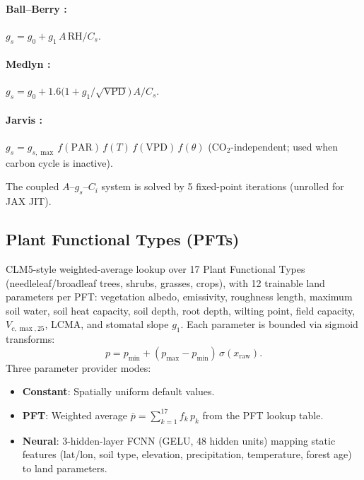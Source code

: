 \documentclass[11pt,a4paper]{article}
\begin{document}
\paragraph{Ball--Berry \citep{Ball1987}:}
$g_s = g_0 + g_1\,A\,\mathrm{RH}/C_s.$

\paragraph{Medlyn \citep{Medlyn2011}:}
$g_s = g_0 + 1.6\bigl(1+g_1/\!\sqrt{\mathrm{VPD}}\bigr)\,A/C_s.$

\paragraph{Jarvis \citep{Jarvis1976}:}
$g_s = g_{s,\max}\,f(\mathrm{PAR})\,f(T)\,f(\mathrm{VPD})\,f(\theta)$ \quad (CO$_2$-independent; used when carbon cycle is inactive).

The coupled $A$--$g_s$--$C_i$ system is solved by 5 fixed-point iterations (unrolled for JAX JIT).

\subsection{Plant Functional Types (PFTs)}

CLM5-style weighted-average lookup over 17 Plant Functional Types (needleleaf/broadleaf trees, shrubs, grasses, crops), with 12 trainable land parameters per PFT: vegetation albedo, emissivity, roughness length, maximum soil water, soil heat capacity, soil depth, root depth, wilting point, field capacity, $V_{c,\max,25}$, LCMA, and stomatal slope $g_1$.  Each parameter is bounded via sigmoid transforms:
\begin{equation}
  p = p_{\min} + (p_{\max}-p_{\min})\,\sigma(x_{\mathrm{raw}}).
\end{equation}
Three parameter provider modes:
\begin{itemize}[nosep]
  \item \textbf{Constant}: Spatially uniform default values.
  \item \textbf{PFT}: Weighted average $\bar p=\sum_{k=1}^{17}f_k\,p_k$ from the PFT lookup table.
  \item \textbf{Neural}: 3-hidden-layer FCNN (GELU, 48 hidden units) mapping static features (lat/lon, soil type, elevation, precipitation, temperature, forest age) to land parameters.
\end{itemize}
\end{document}
